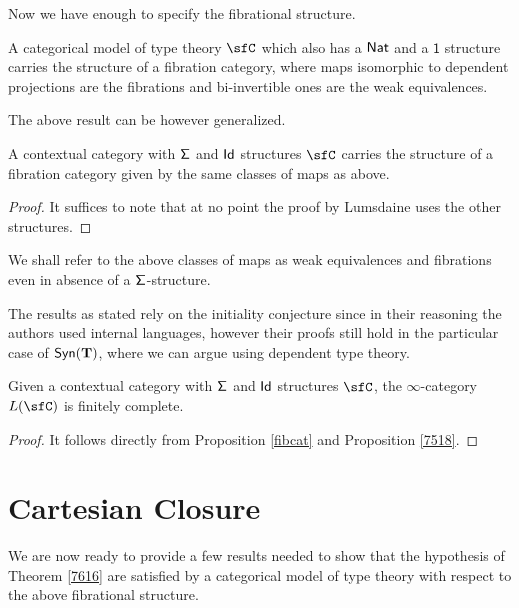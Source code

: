 Now we have enough to specify the fibrational structure.

\begin{prop}
  A categorical model of type theory $\sfC$ which also has a $\operatorname{\mathsf{Nat}}$ and a
  $\mathsf{1}$
  structure carries the structure of a fibration category, where maps isomorphic
  to dependent projections are the fibrations and bi-invertible ones are the
  weak equivalences.
\end{prop}

The above result can be however generalized.

\begin{prop}\label{fibcat}
  A contextual category with $\operatorname{\mathsf{\Sigma}}$ and $\operatorname{\mathsf{Id}}$ structures $\sfC$ carries the
  structure of a fibration category given by the same classes of maps as above.
\end{prop}
\begin{proof}
  It suffices to note that at no point the proof by Lumsdaine uses the other
  structures.
\end{proof}

\begin{rmk}
  We shall refer to the above classes of maps as weak equivalences and
  fibrations even in absence of a $\operatorname{\mathsf{\Sigma}}$-structure.
\end{rmk}

\begin{rmk}
  The results as stated rely on the initiality conjecture since in their
  reasoning
  the authors used internal languages, however their proofs still hold in the
  particular case of $\mathsf{Syn}(\mathbf{T})$, where we can argue using dependent type theory.
\end{rmk}

\begin{cor}\label{fincompl1}
  Given a contextual category with $\operatorname{\mathsf{\Sigma}}$ and $\operatorname{\mathsf{Id}}$ structures $\sfC$, the
  $\infty$-category $L(\sfC)$ is finitely complete.
\end{cor}
\begin{proof}
  It follows directly from Proposition \ref{fibcat} and Proposition \ref{7518}.
\end{proof}

\section{Cartesian Closure}

We are now ready to provide a few results needed to show that the hypothesis of
Theorem \ref{7616} are satisfied by a categorical
model of type theory with respect to the above fibrational structure.

